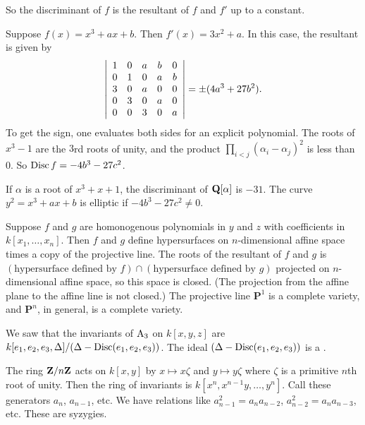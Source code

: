 \documentclass[11pt, oneside,margin=1in]{article}
\begin{document}
So the discriminant of $f$ is the resultant of $f$ and $f'$ up to a constant. 
\begin{example}[ ]\label{}
Suppose $f(x)= x^3 + ax + b$. Then $f'(x)=3x^2 + a$. In this case, the resultant is given by
\begin{align*}
	\left \lvert 
		\begin{array}{ccccc}
			1 & 0 & a & b & 0\\
			0 & 1 & 0 & a & b\\
			3 & 0 & a & 0 & 0\\
			0 & 3 & 0 & a & 0\\
			0 & 0 & 3 & 0 & a
		\end{array}
	 \right \rvert=\pm(4a^3 + 27b^2).	
\end{align*}
To get the sign, one evaluates both sides for an explicit polynomial. The roots of $x^3-1$ are the $3$rd roots of unity, and the product $\prod_{i<j} (\alpha_i-\alpha_j)^2$ is less than $0$. So $\operatorname{Disc} f = -4b^3 - 27c^2$.
\end{example}

\begin{example}\label{}
If $\alpha$ is a root of $x^3 + x + 1$, the discriminant of $\mathbf Q[\alpha]$ is $-31$. The curve $y^2  =x^3 + ax +b$ is elliptic if $-4b^3 - 27c^2 \ne 0$.
\end{example}

Suppose $f$ and $g$ are homonogenous polynomials in $y$ and $z$ with coefficients in $k[x_1,\hdots,x_n]$. Then $f$ and $g$ define hypersurfaces on $n$-dimensional affine space times a copy of the projective line. The roots of the resultant of $f$ and $g$ is $(\textrm{hypersurface defined by $f$}) \cap( \textrm{hypersurface defined by $g$})$ projected on $n$-dimensional affine space, so this space is closed. (The projection from the affine plane to the affine line is not closed.) The projective line $\mathbf{P}^1$ is a complete variety, and $\mathbf{P}^n$, in general, is a complete variety.

We saw that the invariants of $\operatorname{A}_3$ on $k[x,y,z]$ are $k[e_1,e_2,e_3,\Delta]/(\Delta - \operatorname{Disc}(e_1,e_2,e_3))$. The ideal $(\Delta - \operatorname{Disc}(e_1,e_2,e_3))$ is a .

\begin{example}[Syzygies]\label{}
The ring $\mathbf Z / n\mathbf Z$ acts on $k[x,y]$ by $x\longmapsto x\zeta$ and $y\longmapsto y\zeta$ where $\zeta$ is a primitive $n$th root of unity. Then the ring of invariants is $k[x^n, x^{n-1}y, \hdots, y^n]$. Call these generators $a_n$, $a_{n-1}$, etc. We have relations like $a_{n-1}^2 = a_na_{n-2}$, $a_{n-2}^2 = a_na_{n-3}$, etc. These are syzygies.
\end{example}
\end{document}

